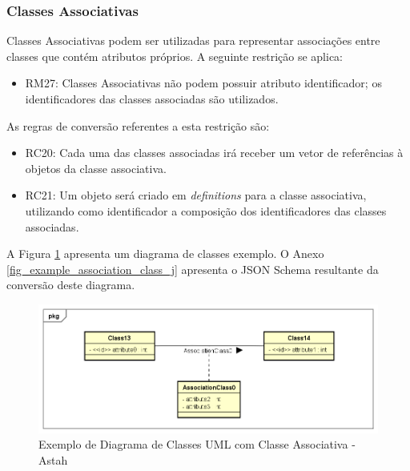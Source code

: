 
\subsubsection{Classes Associativas}

Classes Associativas podem ser utilizadas para representar associações entre classes que contém atributos próprios. A seguinte restrição se aplica:

\begin{itemize}
    \item RM27: Classes Associativas não podem possuir atributo identificador; os identificadores das classes associadas são utilizados.
\end{itemize}

As regras de conversão referentes a esta restrição são:

\begin{itemize}
    \item RC20: Cada uma das classes associadas irá receber um vetor de referências à objetos da classe associativa.

    \item RC21: Um objeto será criado em \textit{definitions} para a classe associativa, utilizando como identificador a composição dos identificadores das classes associadas.
\end{itemize}

A Figura \ref{fig_example_association_class} apresenta um diagrama de classes exemplo. O Anexo \ref{fig_example_association_class_j} apresenta o JSON Schema resultante da conversão deste diagrama.

\begin{figure}
    \begin{center}
        \includegraphics[scale=0.7]{imagens/Example_Association_Class.png}
    \end{center}
	\caption{\label{fig_example_association_class}Exemplo de Diagrama de Classes UML com Classe Associativa - Astah}
\end{figure}


